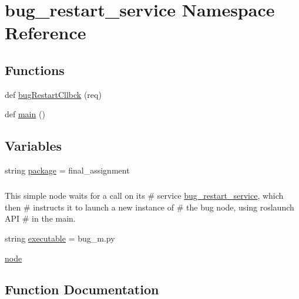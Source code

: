 \hypertarget{namespacebug__restart__service}{}\section{bug\+\_\+restart\+\_\+service Namespace Reference}
\label{namespacebug__restart__service}
\subsection*{Functions}
\begin{DoxyCompactItemize}
\item 
def \hyperlink{namespacebug__restart__service_ab9e9f5c082d48d8d83c3e6b563dc3df5}{bug\+Restart\+Cllbck} (req)
\item 
def \hyperlink{namespacebug__restart__service_ad1c3c4a1d8a4d3bc3e3c943e6f06e39e}{main} ()
\end{DoxyCompactItemize}
\subsection*{Variables}
\begin{DoxyCompactItemize}
\item 
string \hyperlink{namespacebug__restart__service_a111ac98f73b77147bc204f0de607151c}{package} = \textquotesingle{}final\+\_\+assignment\textquotesingle{}
\begin{DoxyCompactList}\small\item\em \subparagraph*{}

This simple node waits for a call on its \# service \textquotesingle{}\hyperlink{namespacebug__restart__service}{bug\+\_\+restart\+\_\+service}\textquotesingle{}, which then \# instructs it to launch a new instance of \# the \textquotesingle{}bug\textquotesingle{} node, using \textquotesingle{}roslaunch\textquotesingle{} A\+PI \# in the \textquotesingle{}main\textquotesingle{}. \end{DoxyCompactList}\item 
string \hyperlink{namespacebug__restart__service_acd88d59006d4d0c6423ccc40ed3986d2}{executable} = \textquotesingle{}bug\+\_\+m.\+py\textquotesingle{}
\item 
\hyperlink{namespacebug__restart__service_a42bb9af0de4ac22222ad7dc5a12018be}{node}
\end{DoxyCompactItemize}


\subsection{Function Documentation}
